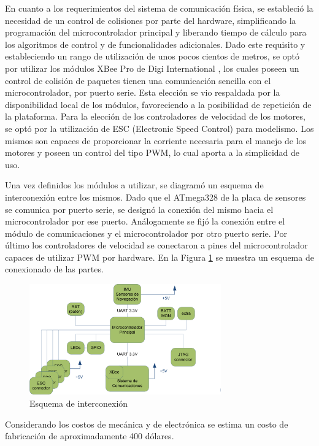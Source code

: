 \documentclass[a4paper, conference]{IEEEtran}
\begin{document}
En cuanto a los requerimientos del sistema de comunicación física, se estableció la necesidad de un control de colisiones por parte del hardware, simplificando la programación del microcontrolador principal y liberando tiempo de cálculo para los algoritmos de control y de funcionalidades adicionales. Dado este requisito y estableciendo un rango de utilización de unos pocos cientos de metros, se optó por utilizar los módulos XBee Pro de Digi International \cite{xbee}, los cuales poseen un control de colisión de paquetes tienen una comunicación sencilla con el microcontrolador, por puerto serie. Esta elección se vio respaldada por la disponibilidad local de los módulos, favoreciendo a la posibilidad de repetición de la plataforma.
Para la elección de los controladores de velocidad de los motores, se optó por la utilización de ESC (Electronic Speed Control) para modelismo. Los mismos son capaces de proporcionar la corriente necesaria para el manejo de los motores y poseen un control del tipo PWM, lo cual aporta a la simplicidad de uso.

Una vez definidos los módulos a utilizar, se diagramó un esquema de interconexión entre los mismos. Dado que el ATmega328 de la placa de sensores se comunica por puerto serie, se designó la conexión del mismo hacia el microcontrolador por ese puerto. Análogamente se fijó la conexión entre el módulo de comunicaciones y el microcontrolador por otro puerto serie. Por último los controladores de velocidad se conectaron a pines del microcontrolador capaces de utilizar PWM por hardware. En la Figura \ref{ref:conexiones} se muestra un esquema de conexionado de las partes.
	
\begin{figure}[btp]
\centering
\includegraphics[width=3.25in]{interconexion.png}
\caption{Esquema de interconexión}
\label{ref:conexiones}
\end{figure}

Considerando los costos de mecánica y de electrónica se estima un costo de fabricación de aproximadamente 400 dólares.
\end{document}
